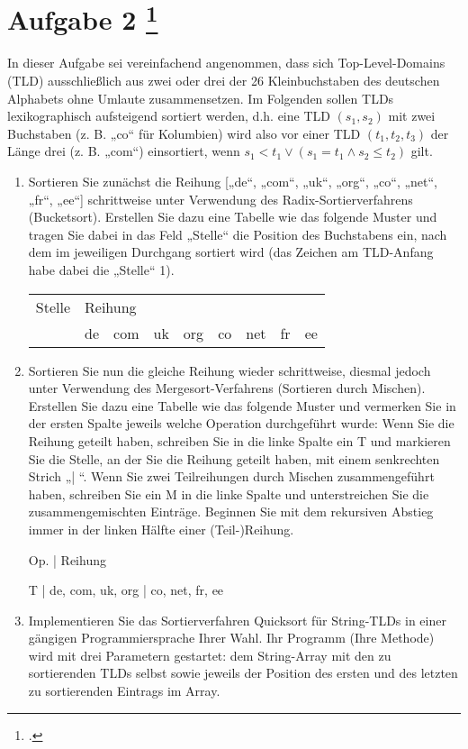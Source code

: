 \documentclass{lehramt-informatik-aufgabe}
\begin{document}
\section{Aufgabe 2
\footcite{66115:2017:03}}

In dieser Aufgabe sei vereinfachend angenommen, dass sich
Top-Level-Domains (TLD) ausschließlich aus zwei oder drei der 26
Kleinbuchstaben des deutschen Alphabets ohne Umlaute zusammensetzen. Im
Folgenden sollen TLDs lexikographisch aufsteigend sortiert werden, d.h.
eine TLD $(s_1, s_2)$ mit zwei Buchstaben (z. B. „co“ für Kolumbien)
wird also vor einer TLD $(t_1, t_2, t_3)$ der Länge drei (z. B. „com“)
einsortiert, wenn $s_1 < t_1  \lor (s_1 = t_1 \land s_2 \leq t_2)$ gilt.

\begin{enumerate}


\item Sortieren Sie zunächst die Reihung [„de“, „com“, „uk“, „org“,
„co“, „net“, „fr“, „ee“] schrittweise unter Verwendung des
Radix-Sortierverfahrens (Bucketsort). Erstellen Sie dazu eine Tabelle
wie das folgende Muster und tragen Sie dabei in das Feld „Stelle“ die
Position des Buchstabens ein, nach dem im jeweiligen Durchgang sortiert
wird (das Zeichen am TLD-Anfang habe dabei die „Stelle“ 1).

\begin{tabular}{lllllllll}
Stelle & \multicolumn{7}{l}{Reihung} \\
       & de & com & uk & org & co & net & fr & ee \\
\end{tabular}


\item Sortieren Sie nun die gleiche Reihung wieder schrittweise, diesmal
jedoch unter Verwendung des Mergesort-Verfahrens (Sortieren durch
Mischen). Erstellen Sie dazu eine Tabelle wie das folgende Muster und
vermerken Sie in der ersten Spalte jeweils welche Operation durchgeführt
wurde: Wenn Sie die Reihung geteilt haben, schreiben Sie in die linke
Spalte ein T und markieren Sie die Stelle, an der Sie die Reihung
geteilt haben, mit einem senkrechten Strich „| “. Wenn Sie zwei
Teilreihungen durch Mischen zusammengeführt haben, schreiben Sie ein M
in die linke Spalte und unterstreichen Sie die zusammengemischten
Einträge. Beginnen Sie mit dem rekursiven Abstieg immer in der linken
Hälfte einer (Teil-)Reihung.

Op. | Reihung

T | de, com, uk, org | co, net, fr, ee


\item Implementieren Sie das Sortierverfahren Quicksort für String-TLDs
in einer gängigen Programmiersprache Ihrer Wahl. Ihr Programm (Ihre
Methode) wird mit drei Parametern gestartet: dem String-Array mit den zu
sortierenden TLDs selbst sowie jeweils der Position des ersten und des
letzten zu sortierenden Eintrags im Array.

\end{enumerate}
\end{document}
